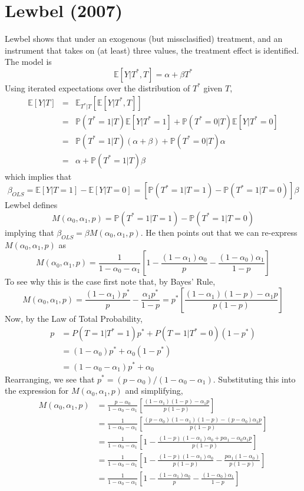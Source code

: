 \section{Lewbel (2007)}

Lewbel shows that under an exogenous (but missclasified) treatment,
and an instrument that takes on (at least) three values, the treatment
effect is identified. 
The model is 
\[
\mathbb{E}[Y|T^{*},T]=\alpha+\beta T^{*}
\]
Using iterated expectations over the distribution of $T^{*}$ given
$T$, 
\begin{eqnarray*}
\mathbb{E}[Y|T]&=& \mathbb{E}_{T^{*}|T}\left[\mathbb{E}[Y|T^{*},T]\right]\\
&=& \mathbb{P}(T^{*}=1|T)\mathbb{E}[Y|T^{*}=1]+\mathbb{P}(T^{*}=0|T)\mathbb{E}[Y|T^{*}=0]\\
&=& \mathbb{P}(T^{*}=1|T)(\alpha+\beta)+\mathbb{P}(T^{*}=0|T)\alpha\\
&=& \alpha+\mathbb{P}(T^{*}=1|T)\beta
\end{eqnarray*}
which implies that 
\[
\beta_{OLS}= \mathbb{E}[Y|T=1]-\mathbb{E}[Y|T=0]=\left[\mathbb{P}(T^{*}=1|T=1)-\mathbb{P}(T^{*}=1|T=0)\right]\beta
\]
Lewbel defines 
$$M(\alpha_{0},\alpha_{1},p)=\mathbb{P}(T^{*}=1|T=1)-\mathbb{P}(T^{*}=1|T=0)$$
implying that $\beta_{OLS} =\beta M(\alpha_{0},\alpha_{1},p)$.
He then points out that we can re-express $M(\alpha_0, \alpha_1,p)$ as
\[
M(\alpha_{0},\alpha_{1},p)=\frac{1}{1-\alpha_{0}-\alpha_{1}}\left[1-\frac{(1-\alpha_{1})\alpha_{0}}{p}-\frac{(1-\alpha_{0})\alpha_{1}}{1-p}\right]
\]
To see why this is the case first note that, by Bayes' Rule,
\begin{equation*}
M(\alpha_{0},\alpha_{1},p) = \frac{(1-\alpha_{1})p^{*}}{p}-\frac{\alpha_{1}p^{*}}{1-p}
=p^{*}\left[\frac{(1-\alpha_{1})(1-p)-\alpha_{1}p}{p(1-p)}\right]
\end{equation*}
Now, by the Law of Total Probability,
\begin{align*}
  p &= P(T=1|T^*=1)p^* + P(T=1|T^*=0)(1-p^*)\\
  &= (1 - \alpha_0)p^* + \alpha_0 (1-p^*)\\
  &= (1 - \alpha_0 - \alpha_1)p^* + \alpha_0
\end{align*}
Rearranging, we see that $p^* = (p - \alpha_0)/(1 - \alpha_0 - \alpha_1)$.
Substituting this into the expression for $M(\alpha_0, \alpha_1, p)$ and simplifying,
\begin{align*}
  M(\alpha_{0},\alpha_{1},p) &=\frac{p-\alpha_{0}}{1-\alpha_{0}-\alpha_{1}}\left[\frac{(1-\alpha_{1})(1-p)-\alpha_{1}p}{p(1-p)}\right]\\
&=\frac{1}{1-\alpha_{0}-\alpha_{1}}\left[\frac{(p-\alpha_{0})(1-\alpha_{1})(1-p)-(p-\alpha_{0})\alpha_{1}p}{p(1-p)}\right]\\
&=\frac{1}{1-\alpha_{0}-\alpha_{1}}\left[1-\frac{(1-p)(1-\alpha_{1})\alpha_{0}+p\alpha_{1}-\alpha_{0}\alpha_{1}p}{p(1-p)}\right]\\
&=\frac{1}{1-\alpha_{0}-\alpha_{1}}\left[1-\frac{(1-p)(1-\alpha_{1})\alpha_{0}}{p(1-p)}-\frac{p\alpha_{1}(1-\alpha_{0})}{p(1-p)}\right]\\
&=\frac{1}{1-\alpha_{0}-\alpha_{1}}\left[1-\frac{(1-\alpha_{1})\alpha_{0}}{p}-\frac{(1-\alpha_{0})\alpha_{1}}{1-p}\right]
\end{align*}
